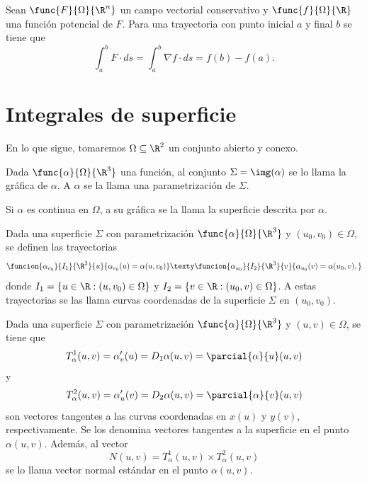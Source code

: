\documentclass[a4,11pt]{aleph-notas}
\begin{document}
\begin{teo}
    Sean $\func{F}{\Omega}{\R^n}$ un campo vectorial conservativo y 
    $\func{f}{\Omega}{\R}$ una función potencial de $F$. Para una trayectoria con punto inicial $a$ y final $b$ se tiene que
    \[
        \int_a^b F\cdot ds = \int_a^b \nabla f\cdot ds = f(b)-f(a).
    \]
\end{teo}

\section{Integrales de superficie}

En lo que sigue, tomaremos $\Omega\subseteq \R^2$ un conjunto abierto y conexo.

\begin{defi}
    Dada $\func{\alpha}{\Omega}{\R^3}$ una función, al conjunto $\Sigma=\img(\alpha)$ se lo llama la gráfica de $\alpha$. A $\alpha$ se la llama una parametrización de $\Sigma$.
    
    Si $\alpha$ es continua en $\Omega$, a su gráfica se la llama la superficie descrita por $\alpha$.
\end{defi}

 
\begin{defi}
    Dada una superficie $\Sigma$ con parametrización $\func{\alpha}{\Omega}{\R^3}$ y $(u_0,v_0)\in \Omega$, se definen las trayectorias
    \[
        \funcion{\alpha_{v_0}}{I_1}{\R^3}{u}{\alpha_{v_0}(u)=\alpha(u,v_0)}
        \texty
        \funcion{\alpha_{u_0}}{I_2}{\R^3}{v}{\alpha_{u_0}(v)=\alpha(u_0,v),}
    \]
    donde $I_1=\{u\in\R:(u,v_0)\in \Omega\}$ y $I_2=\{v\in\R:(u_0,v)\in \Omega\}$. A estas trayectorias se las llama curvas coordenadas de la superficie $\Sigma$ en $(u_0,v_0)$.
\end{defi}

 
\begin{defi}
    Dada una superficie $\Sigma$ con parametrización $\func{\alpha}{\Omega}{\R^3}$ y $(u,v)\in \Omega$, se tiene que
    \[
        T_\alpha^1(u,v) = \alpha_v'(u) = D_1 \alpha(u,v) = \parcial{\alpha}{u}(u,v)
    \]
    y
    \[
        T_\alpha^2(u,v) = \alpha_u'(v) = D_2 \alpha(u,v) = \parcial{\alpha}{v}(u,v)
    \]
    son vectores tangentes a las curvas coordenadas en $x(u)$ y $y(v)$, respectivamente. Se los denomina vectores tangentes a la superficie en el punto $\alpha(u,v)$. Además, al vector
    \[
        N(u,v) = T_\alpha^1(u,v) \times T_\alpha^2(u,v)
    \]
    se lo llama vector normal estándar en el punto $\alpha(u,v)$.
\end{defi}
\end{document}
